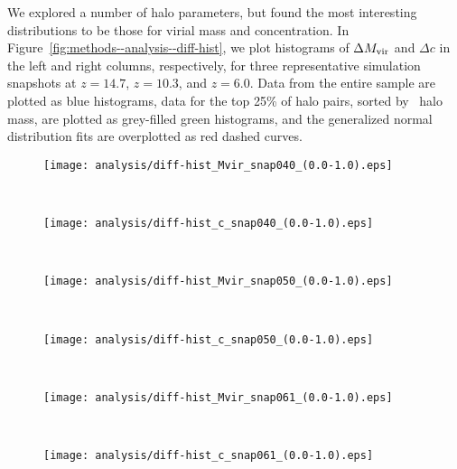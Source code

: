 We explored a number of halo parameters, but found the most interesting distributions to be those for virial mass and concentration.  In Figure~\ref{fig:methods--analysis--diff-hist}, we plot histograms of $\Delta {M_{\mathrm{vir}}}$ and $\Delta c$ in the left and right columns, respectively, for three representative simulation snapshots at $z = 14.7$, $z = 10.3$, and $z = 6.0$.  Data from the entire sample are plotted as blue histograms, data for the top 25\% of halo pairs, sorted by \lpt\ halo mass, are plotted as grey-filled green histograms, and the generalized normal distribution fits are overplotted as red dashed curves.

\begin{figure*}[t]
	\centering
	\begin{subfigure}{}
		\texttt{[image: analysis/diff-hist\_Mvir\_snap040\_(0.0-1.0).eps]}
	\end{subfigure}
	~
	\begin{subfigure}{}
		\texttt{[image: analysis/diff-hist\_c\_snap040\_(0.0-1.0).eps]}
	\end{subfigure}
	\\
	\begin{subfigure}{}
		\texttt{[image: analysis/diff-hist\_Mvir\_snap050\_(0.0-1.0).eps]}
	\end{subfigure}
	~
	\begin{subfigure}{}
		\texttt{[image: analysis/diff-hist\_c\_snap050\_(0.0-1.0).eps]}
	\end{subfigure}
	\\
	\begin{subfigure}{}
		\texttt{[image: analysis/diff-hist\_Mvir\_snap061\_(0.0-1.0).eps]}
	\end{subfigure}
	~
	\begin{subfigure}{}
		\texttt{[image: analysis/diff-hist\_c\_snap061\_(0.0-1.0).eps]}
	\end{subfigure}
	\caption[Histograms of $\Delta M_{\mathrm{vir}}$ and $\Delta c$]{\footnotesize Histograms of $\Delta M_{\mathrm{vir}}$ (\textit{left column}) and $\Delta c$ (\textit{right column}) for snapshots at $z = 14.7$, $z = 10.3$, and $z = 6.0$ (\textit{top, middle, and bottom panels, respectively}).  The small gray-filled histograms count only the top 25\% most massive halos.  The main histograms are fit with a generalized normal distribution with parameters for mean, scale, and shape, overplotted as the red dashed line (see Equation~\ref{eq:analysis--methods--generalized_normal}).}
	\label{fig:methods--analysis--diff-hist}
\end{figure*}




